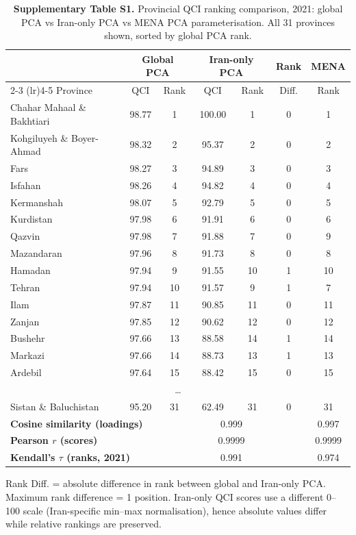 \documentclass[12pt]{article}
\begin{document}
\begin{table}[htbp]
\centering
\caption*{\textbf{Supplementary Table S1.} Provincial QCI ranking comparison, 2021: global PCA vs Iran-only PCA vs MENA PCA parameterisation. All 31 provinces shown, sorted by global PCA rank.}
\small
\begin{tabular}{lcccccc}
\toprule
 & \multicolumn{2}{c}{Global PCA} & \multicolumn{2}{c}{Iran-only PCA} & Rank & MENA \\
\cmidrule(lr){2-3} \cmidrule(lr){4-5}
Province & QCI & Rank & QCI & Rank & Diff. & Rank \\
\midrule
Chahar Mahaal \& Bakhtiari & 98.77 & 1 & 100.00 & 1 & 0 & 1 \\
Kohgiluyeh \& Boyer-Ahmad & 98.32 & 2 & 95.37 & 2 & 0 & 2 \\
Fars & 98.27 & 3 & 94.89 & 3 & 0 & 3 \\
Isfahan & 98.26 & 4 & 94.82 & 4 & 0 & 4 \\
Kermanshah & 98.07 & 5 & 92.79 & 5 & 0 & 5 \\
Kurdistan & 97.98 & 6 & 91.91 & 6 & 0 & 6 \\
Qazvin & 97.98 & 7 & 91.88 & 7 & 0 & 9 \\
Mazandaran & 97.96 & 8 & 91.73 & 8 & 0 & 8 \\
Hamadan & 97.94 & 9 & 91.55 & 10 & 1 & 10 \\
Tehran & 97.94 & 10 & 91.57 & 9 & 1 & 7 \\
Ilam & 97.87 & 11 & 90.85 & 11 & 0 & 11 \\
Zanjan & 97.85 & 12 & 90.62 & 12 & 0 & 12 \\
Bushehr & 97.66 & 13 & 88.58 & 14 & 1 & 14 \\
Markazi & 97.66 & 14 & 88.73 & 13 & 1 & 13 \\
Ardebil & 97.64 & 15 & 88.42 & 15 & 0 & 15 \\
\multicolumn{7}{c}{\dots} \\
Sistan \& Baluchistan & 95.20 & 31 & 62.49 & 31 & 0 & 31 \\
\midrule
\multicolumn{3}{l}{\textbf{Cosine similarity (loadings)}} & \multicolumn{2}{c}{0.999} & & 0.997 \\
\multicolumn{3}{l}{\textbf{Pearson $r$ (scores)}} & \multicolumn{2}{c}{0.9999} & & 0.9999 \\
\multicolumn{3}{l}{\textbf{Kendall's $\tau$ (ranks, 2021)}} & \multicolumn{2}{c}{0.991} & & 0.974 \\
\bottomrule
\end{tabular}

\vspace{0.5em}
\noindent\small Rank Diff. = absolute difference in rank between global and Iran-only PCA. Maximum rank difference = 1 position. Iran-only QCI scores use a different 0--100 scale (Iran-specific min--max normalisation), hence absolute values differ while relative rankings are preserved.
\end{table}
\end{document}
